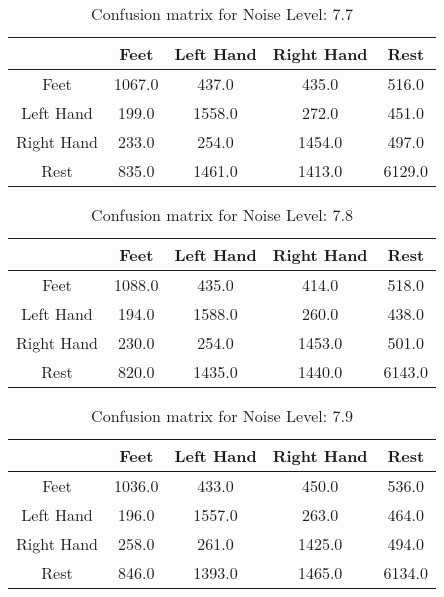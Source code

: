 \begin{table}[!htbp]
    \centering
    \begin{tabular}{|c||c|c|c|c|}
        \hline
		 & Feet & Left Hand & Right Hand & Rest \\
        \hline
        \hline
        Feet & 1067.0 & 437.0 & 435.0 & 516.0 \\
        \hline
        Left Hand & 199.0 & 1558.0 & 272.0 & 451.0 \\
        \hline
        Right Hand & 233.0 & 254.0 & 1454.0 & 497.0 \\
        \hline
        Rest & 835.0 & 1461.0 & 1413.0 & 6129.0 \\
        \hline
    \end{tabular}
    \caption{Confusion matrix for Noise Level: 7.7}
\end{table}

\begin{table}[!htbp]
    \centering
    \begin{tabular}{|c||c|c|c|c|}
        \hline
		 & Feet & Left Hand & Right Hand & Rest \\
        \hline
        \hline
        Feet & 1088.0 & 435.0 & 414.0 & 518.0 \\
        \hline
        Left Hand & 194.0 & 1588.0 & 260.0 & 438.0 \\
        \hline
        Right Hand & 230.0 & 254.0 & 1453.0 & 501.0 \\
        \hline
        Rest & 820.0 & 1435.0 & 1440.0 & 6143.0 \\
        \hline
    \end{tabular}
    \caption{Confusion matrix for Noise Level: 7.8}
\end{table}

\begin{table}[!htbp]
    \centering
    \begin{tabular}{|c||c|c|c|c|}
        \hline
		 & Feet & Left Hand & Right Hand & Rest \\
        \hline
        \hline
        Feet & 1036.0 & 433.0 & 450.0 & 536.0 \\
        \hline
        Left Hand & 196.0 & 1557.0 & 263.0 & 464.0 \\
        \hline
        Right Hand & 258.0 & 261.0 & 1425.0 & 494.0 \\
        \hline
        Rest & 846.0 & 1393.0 & 1465.0 & 6134.0 \\
        \hline
    \end{tabular}
    \caption{Confusion matrix for Noise Level: 7.9}
\end{table}

